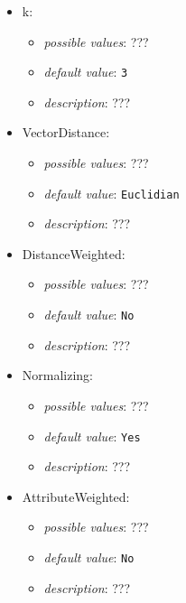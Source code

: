 \documentclass{article}
\begin{document}
\begin{itemize}
    \item k:
           \begin{itemize}
                \item \emph{possible values}: ???
                \item \emph{default value}: \texttt{3}
                \item \emph{description}: ???
           \end{itemize}
    \item VectorDistance:
           \begin{itemize}
                \item \emph{possible values}: ???
                \item \emph{default value}: \texttt{Euclidian}
                \item \emph{description}: ???
           \end{itemize}
    \item DistanceWeighted:
           \begin{itemize}
                \item \emph{possible values}: ???
                \item \emph{default value}: \texttt{No}
                \item \emph{description}: ???
           \end{itemize}
    \item Normalizing:
           \begin{itemize}
                \item \emph{possible values}: ???
                \item \emph{default value}: \texttt{Yes}
                \item \emph{description}: ???
           \end{itemize}
    \item AttributeWeighted:
           \begin{itemize}
                \item \emph{possible values}: ???
                \item \emph{default value}: \texttt{No}
                \item \emph{description}: ???
           \end{itemize}
\end{itemize}
\end{document}
